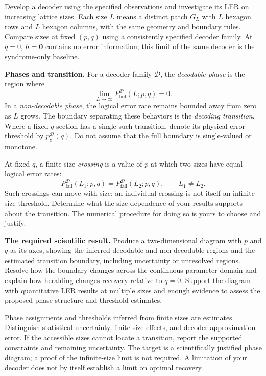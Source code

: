\documentclass[11pt,letterpaper]{article}
\newcommand{\sect}[1]{\vspace{0.55em}{\large\sffamily\bfseries\color{ink}#1}\par\vspace{0.15em}}
\newcommand{\loss}{P_{\mathrm{fail}}}
\begin{document}
\newpage
\sect{5. Construct the decoding phase diagram}
Develop a decoder using the specified observations and investigate its LER on
increasing lattice sizes. Each size $L$ means a distinct patch $G_L$ with $L$
hexagon rows and $L$ hexagon columns, with the same geometry and boundary rules.
Compare sizes at fixed $(p,q)$ using a consistently specified decoder family.
At $q=0$, $h=\mathbf0$ contains no error information; this limit of the same
decoder is the syndrome-only baseline.

\textbf{Phases and transition.}
For a decoder family $\mathcal D$, the \emph{decodable phase} is the region where
\[
             \lim_{L\to\infty}\loss^{\mathcal D}(L;p,q)=0.
\]
In a \emph{non-decodable phase}, the logical error rate remains bounded away
from zero as $L$ grows. The boundary separating these behaviors is the
\emph{decoding transition}. Where a fixed-$q$ section has a single such
transition, denote its physical-error threshold by $p_c^{\mathcal D}(q)$.
Do not assume that the full boundary is single-valued or monotone.

At fixed $q$, a finite-size \emph{crossing} is a value of $p$ at which two
sizes have equal logical error rates:
\[
 \loss^{\mathcal D}(L_1;p,q)=\loss^{\mathcal D}(L_2;p,q),\qquad L_1\ne L_2.
\]
Such crossings can move with size; an individual crossing is not itself an
infinite-size threshold. Determine what the size dependence of your results
supports about the transition. The numerical procedure for doing so is yours
to choose and justify.

\textbf{The required scientific result.}
Produce a two-dimensional diagram with $p$ and $q$ as its axes, showing the
inferred decodable and non-decodable regions and the estimated transition
boundary, including uncertainty or unresolved regions. Resolve how the boundary
changes across the continuous parameter domain and explain how heralding
changes recovery relative to $q=0$. Support the diagram with quantitative LER
results at multiple sizes and enough evidence to assess the proposed phase
structure and threshold estimates.

Phase assignments and thresholds inferred from finite sizes are estimates.
Distinguish statistical uncertainty, finite-size effects, and decoder
approximation error. If the accessible sizes cannot locate a transition,
report the supported constraints and remaining uncertainty. The target is a
scientifically justified phase diagram; a proof of the infinite-size limit is
not required. A limitation of your decoder does not by itself establish a
limit on optimal recovery.
\end{document}
